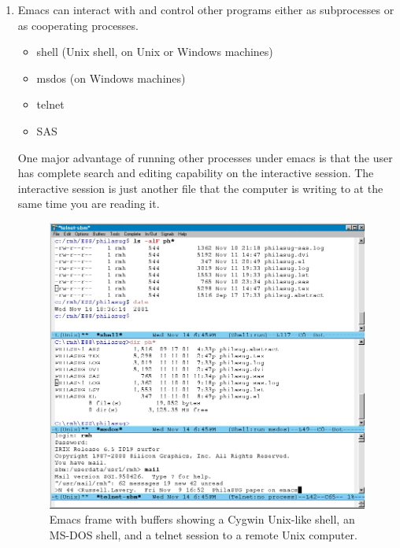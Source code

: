 \begin{enumerate}
\newpage
\item
Emacs can interact with and control other
programs either as subprocesses or as cooperating processes.
\setlength{\topsep}{1ex}
\begin{itemize}
\setlength{\itemsep}{1ex}
\item shell (Unix shell, on Unix or Windows machines)
\item msdos (on Windows machines)
\item telnet
\item SAS
\end{itemize}

One major advantage of running other processes under emacs is that the user
has complete search and editing capability on the interactive session.  The
interactive session is just another file that the computer is writing
to at the same time you are reading it.


\begin{figure}[tbp]
\vspace*{-.25in}
\hspace*{1.25in}
  \includegraphics[angle=0,width=7.5in,natwidth=842,natheight=763]{Image4.png}
\vspace*{-.2in}
  \caption{Emacs frame with buffers showing a Cygwin Unix-like shell,
an MS-DOS shell, and a telnet session to a remote Unix computer.}
  \label{Image4}
\end{figure}


\end{enumerate}
